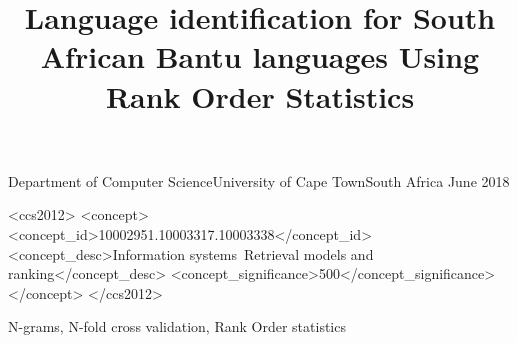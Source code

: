 \documentclass[plain]{sigplanconf}
\begin{document}
	\title{Language identification for South African Bantu languages Using Rank Order Statistics}
	{Department of Computer Science\linebreak University of Cape Town\linebreak South Africa}
	{June 2018}
	\maketitle
	\begin{abstract}
	\end{abstract}
	\begin{CCSXML}
		<ccs2012>
		<concept>
		<concept_id>10002951.10003317.10003338</concept_id>		
		<concept_desc>Information systems~Retrieval models and ranking</concept_desc>
		<concept_significance>500</concept_significance>
		</concept>
		</ccs2012>
	\end{CCSXML}
	\keywords
	N-grams, N-fold cross validation, Rank Order statistics
	
	
	
	
	
\end{document}
